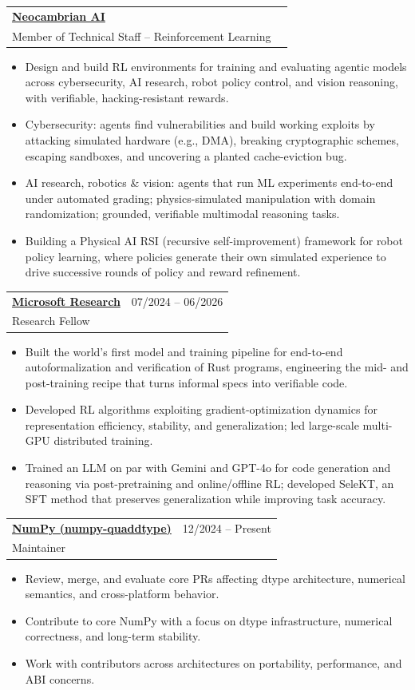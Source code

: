 \documentclass[a4paper,11pt]{article}
\makeatletter
\newcommand{\resumeItemPlain}[1]{\item\small{#1}\vspace{-1pt}}
\newcommand{\resumeSubheading}[4]{%
  \vspace{1pt}\item[]
    \begin{tabular*}{0.99\textwidth}{l@{\extracolsep{\fill}}r}
      \textbf{#1} & #2 \\
      {\small #3} & {\small #4} \\
    \end{tabular*}\vspace{-1pt}}
\newcommand{\resumeItemListStart}{\begin{itemize}[leftmargin=1.3em, label=$\bullet$, itemsep=1pt, topsep=2pt, parsep=0pt]}
\newcommand{\resumeItemListEnd}{\end{itemize}\vspace{-3pt}}
\makeatother
\begin{document}
  \resumeSubheading{\href{https://neocambrian.ai/}{Neocambrian AI}}{}{Member of Technical Staff -- Reinforcement Learning}{}
    \resumeItemListStart
      \resumeItemPlain{Design and build RL environments for training and evaluating agentic models across cybersecurity, AI research, robot policy control, and vision reasoning, with verifiable, hacking-resistant rewards.}
      \resumeItemPlain{Cybersecurity: agents find vulnerabilities and build working exploits by attacking simulated hardware (e.g., DMA), breaking cryptographic schemes, escaping sandboxes, and uncovering a planted cache-eviction bug.}
      \resumeItemPlain{AI research, robotics \& vision: agents that run ML experiments end-to-end under automated grading; physics-simulated manipulation with domain randomization; grounded, verifiable multimodal reasoning tasks.}
      \resumeItemPlain{Building a Physical AI RSI (recursive self-improvement) framework for robot policy learning, where policies generate their own simulated experience to drive successive rounds of policy and reward refinement.}
    \resumeItemListEnd

  \resumeSubheading{\href{https://www.microsoft.com/en-us/research/lab/microsoft-research-india/}{Microsoft Research}}{07/2024 -- 06/2026}{Research Fellow}{}
    \resumeItemListStart
      \resumeItemPlain{Built the world's first model and training pipeline for end-to-end autoformalization and verification of Rust programs, engineering the mid- and post-training recipe that turns informal specs into verifiable code.}
      \resumeItemPlain{Developed RL algorithms exploiting gradient-optimization dynamics for representation efficiency, stability, and generalization; led large-scale multi-GPU distributed training.}
      \resumeItemPlain{Trained an LLM on par with Gemini and GPT-4o for code generation and reasoning via post-pretraining and online/offline RL; developed SeleKT, an SFT method that preserves generalization while improving task accuracy.}
    \resumeItemListEnd

  \resumeSubheading{\href{https://numpy.org/}{NumPy (numpy-quaddtype)}}{12/2024 -- Present}{Maintainer}{}
    \resumeItemListStart
      \resumeItemPlain{Review, merge, and evaluate core PRs affecting dtype architecture, numerical semantics, and cross-platform behavior.}
      \resumeItemPlain{Contribute to core NumPy with a focus on dtype infrastructure, numerical correctness, and long-term stability.}
      \resumeItemPlain{Work with contributors across architectures on portability, performance, and ABI concerns.}
    \resumeItemListEnd
\end{document}
